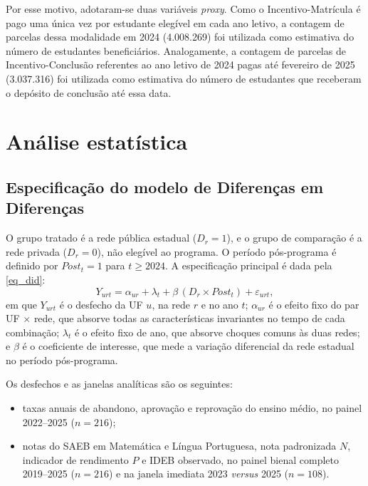 Por esse motivo, adotaram-se duas variáveis \textit{proxy}.
Como o Incentivo-Matrícula é pago uma única vez por estudante elegível em cada ano letivo, a contagem de parcelas dessa modalidade em 2024 (4.008.269) foi utilizada como estimativa do número de estudantes beneficiários.
Analogamente, a contagem de parcelas de Incentivo-Conclusão referentes ao ano letivo de 2024 pagas até fevereiro de 2025 (3.037.316) foi utilizada como estimativa do número de estudantes que receberam o depósito de conclusão até essa data.

\section{Análise estatística}
\label{sec_analise_estatistica}

\subsection{Especificação do modelo de Diferenças em Diferenças}
\label{subsec_especificacao}

O grupo tratado é a rede pública estadual ($D_r = 1$), e o grupo de comparação é a rede privada ($D_r = 0$), não elegível ao programa.
O período pós-programa é definido por $\mathit{Post}_t = 1$ para $t \geq 2024$.
A especificação principal é dada pela \autoref{eq_did}:
\begin{equation}
    \label{eq_did}
    Y_{urt} = \alpha_{ur} + \lambda_t + \beta\,(D_r \times \mathit{Post}_t) + \varepsilon_{urt},
\end{equation}
em que $Y_{urt}$ é o desfecho da UF $u$, na rede $r$ e no ano $t$; $\alpha_{ur}$ é o efeito fixo do par UF $\times$ rede, que absorve todas as características invariantes no tempo de cada combinação; $\lambda_t$ é o efeito fixo de ano, que absorve choques comuns às duas redes; e $\beta$ é o coeficiente de interesse, que mede a variação diferencial da rede estadual no período pós-programa.

Os desfechos e as janelas analíticas são os seguintes:
\begin{itemize}
    \item taxas anuais de abandono, aprovação e reprovação do ensino médio, no painel 2022--2025 ($n = 216$);
    \item notas do SAEB em Matemática e Língua Portuguesa, nota padronizada $N$, indicador de rendimento $P$ e IDEB observado, no painel bienal completo 2019--2025 ($n = 216$) e na janela imediata 2023 \textit{versus} 2025 ($n = 108$).
\end{itemize}

